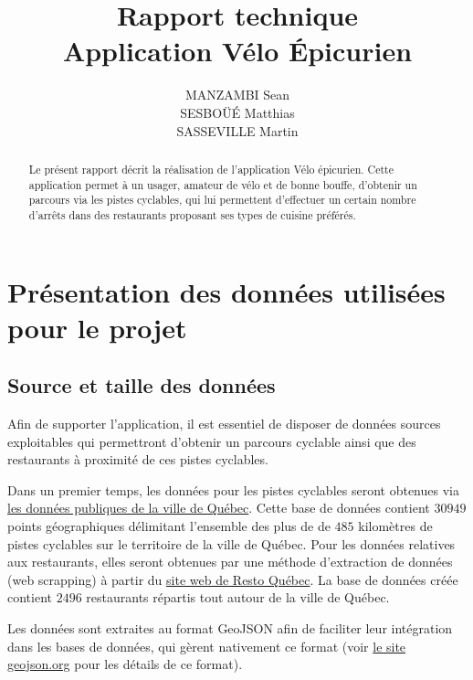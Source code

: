 \documentclass[12pt]{article}
\begin{document}
\title{Rapport technique \\ Application Vélo Épicurien}
\author{MANZAMBI Sean \\ SESBOÜÉ Matthias \\ SASSEVILLE Martin}

\maketitle

\begin{abstract}
    Le présent rapport décrit la réalisation de l'application Vélo épicurien. Cette application permet à un usager, amateur de vélo et de bonne bouffe, d'obtenir un parcours via les pistes cyclables, qui lui permettent d'effectuer un certain nombre d'arrêts dans des restaurants proposant ses types de cuisine préférés.
\end{abstract}

\section{Présentation des données utilisées pour le projet}

\subsection{Source et taille des données}

    Afin de supporter l'application, il est essentiel de disposer de données sources exploitables qui permettront d'obtenir un parcours cyclable ainsi que des restaurants à proximité de ces pistes cyclables. 
    
    Dans un premier temps, les données pour les pistes cyclables seront obtenues via \href{https://www.donneesquebec.ca/recherche/fr/dataset/vque_24}{les données publiques de la ville de Québec}. Cette base de données contient $30 949$ points géographiques délimitant l'ensemble des plus de de $485$ kilomètres de pistes cyclables sur le territoire de la ville de Québec. Pour les données relatives aux restaurants, elles seront obtenues par une méthode d'extraction de données (web scrapping) à partir du \href{https://www.restoquebec.ca/}{site web de Resto Québec}. La base de données créée contient $2 496$ restaurants répartis tout autour de la ville de Québec.

    Les données sont extraites au format GeoJSON afin de faciliter leur intégration dans les bases de données, qui gèrent nativement ce format (voir \href{https://geojson.org/}{le site geojson.org} pour les détails de ce format).
\end{document}
